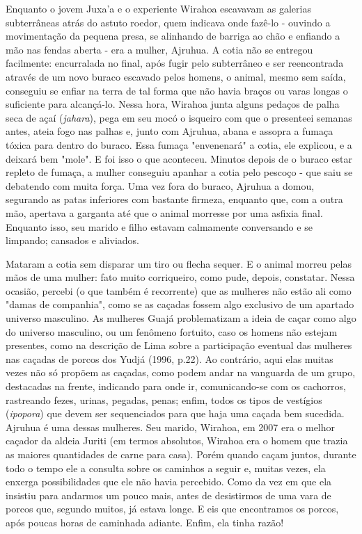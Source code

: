 Enquanto o jovem Juxa'a e o experiente Wirahoa escavavam as galerias
subterrâneas atrás do astuto roedor, quem indicava onde fazê-lo -
ouvindo a movimentação da pequena presa, se alinhando de barriga ao chão
e enfiando a mão nas fendas aberta - era a mulher, Ajruhua. A cotia não
se entregou facilmente: encurralada no final, após fugir pelo
subterrâneo e ser reencontrada através de um novo buraco escavado pelos
homens, o animal, mesmo sem saída, conseguiu se enfiar na terra de tal
forma que não havia braços ou varas longas o suficiente para alcançá-lo.
Nessa hora, Wirahoa junta alguns pedaços de palha seca de açaí
(\emph{jahara}), pega em seu mocó o isqueiro com que o presenteei
semanas antes, ateia fogo nas palhas e, junto com Ajruhua, abana e
assopra a fumaça tóxica para dentro do buraco. Essa fumaça "envenenará"
a cotia, ele explicou, e a deixará bem "mole". E foi isso o que
aconteceu. Minutos depois de o buraco estar repleto de fumaça, a mulher
conseguiu apanhar a cotia pelo pescoço - que saiu se debatendo com muita
força. Uma vez fora do buraco, Ajruhua a domou, segurando as patas
inferiores com bastante firmeza, enquanto que, com a outra mão, apertava
a garganta até que o animal morresse por uma asfixia final. Enquanto
isso, seu marido e filho estavam calmamente conversando e se limpando;
cansados e aliviados.

Mataram a cotia sem disparar um tiro ou flecha sequer. E o animal morreu
pelas mãos de uma mulher: fato muito corriqueiro, como pude, depois,
constatar. Nessa ocasião, percebi (o que também é recorrente) que as
mulheres não estão ali como "damas de companhia", como se as caçadas
fossem algo exclusivo de um apartado universo masculino. As mulheres
Guajá problematizam a ideia de caçar como algo do universo masculino, ou
um fenômeno fortuito, caso os homens não estejam presentes, como na
descrição de Lima sobre a participação eventual das mulheres nas caçadas
de porcos dos Yudjá (1996, p.22). Ao contrário, aqui elas muitas vezes
não só propõem as caçadas, como podem andar na vanguarda de um grupo,
destacadas na frente, indicando para onde ir, comunicando-se com os
cachorros, rastreando fezes, urinas, pegadas, penas; enfim, todos os
tipos de vestígios (\emph{ipopora}) que devem ser sequenciados para que
haja uma caçada bem sucedida. Ajruhua é uma dessas mulheres. Seu marido,
Wirahoa, em 2007 era o melhor caçador da aldeia Juriti (em termos
absolutos, Wirahoa era o homem que trazia as maiores quantidades de
carne para casa). Porém quando caçam juntos, durante todo o tempo ele a
consulta sobre os caminhos a seguir e, muitas vezes, ela enxerga
possibilidades que ele não havia percebido. Como da vez em que ela
insistiu para andarmos um pouco mais, antes de desistirmos de uma vara
de porcos que, segundo muitos, já estava longe. E eis que encontramos os
porcos, após poucas horas de caminhada adiante. Enfim, ela tinha razão!

